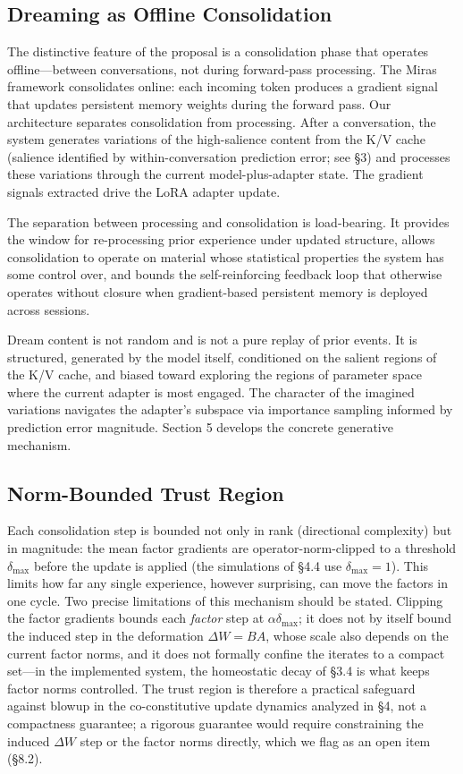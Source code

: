 \documentclass[11pt]{article}
\begin{document}
\subsection{Dreaming as Offline Consolidation}

The distinctive feature of the proposal is a consolidation phase that operates offline---between conversations, not during forward-pass processing. The Miras framework consolidates online: each incoming token produces a gradient signal that updates persistent memory weights during the forward pass. Our architecture separates consolidation from processing. After a conversation, the system generates variations of the high-salience content from the K/V cache (salience identified by within-conversation prediction error; see \S 3) and processes these variations through the current model-plus-adapter state. The gradient signals extracted drive the LoRA adapter update.

The separation between processing and consolidation is load-bearing. It provides the window for re-processing prior experience under updated structure, allows consolidation to operate on material whose statistical properties the system has some control over, and bounds the self-reinforcing feedback loop that otherwise operates without closure when gradient-based persistent memory is deployed across sessions.

Dream content is not random and is not a pure replay of prior events. It is structured, generated by the model itself, conditioned on the salient regions of the K/V cache, and biased toward exploring the regions of parameter space where the current adapter is most engaged. The character of the imagined variations navigates the adapter's subspace via importance sampling informed by prediction error magnitude. Section 5 develops the concrete generative mechanism.

\subsection{Norm-Bounded Trust Region}

Each consolidation step is bounded not only in rank (directional complexity) but in magnitude: the mean factor gradients are operator-norm-clipped to a threshold $\delta_{\max}$ before the update is applied (the simulations of \S 4.4 use $\delta_{\max} = 1$). This limits how far any single experience, however surprising, can move the factors in one cycle. Two precise limitations of this mechanism should be stated. Clipping the factor gradients bounds each \emph{factor} step at $\alpha\delta_{\max}$; it does not by itself bound the induced step in the deformation $\Delta W = BA$, whose scale also depends on the current factor norms, and it does not formally confine the iterates to a compact set---in the implemented system, the homeostatic decay of \S 3.4 is what keeps factor norms controlled. The trust region is therefore a practical safeguard against blowup in the co-constitutive update dynamics analyzed in \S 4, not a compactness guarantee; a rigorous guarantee would require constraining the induced $\Delta W$ step or the factor norms directly, which we flag as an open item (\S 8.2).
\end{document}
